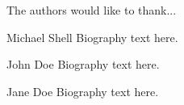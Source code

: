 \documentclass[journal]{IEEEtran}
\begin{document}
The authors would like to thank...






\begin{IEEEbiography}{Michael Shell}
Biography text here.
\end{IEEEbiography}

\begin{IEEEbiographynophoto}{John Doe}
Biography text here.
\end{IEEEbiographynophoto}


\begin{IEEEbiographynophoto}{Jane Doe}
Biography text here.
\end{IEEEbiographynophoto}
\end{document}

